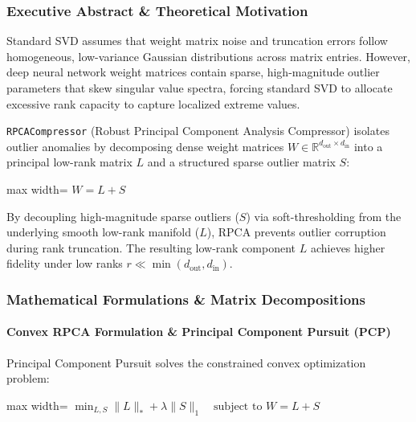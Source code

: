 \subsubsection*{Executive Abstract \& Theoretical Motivation}
Standard SVD assumes that weight matrix noise and truncation errors follow homogeneous, low-variance Gaussian distributions across matrix entries. However, deep neural network weight matrices contain sparse, high-magnitude outlier parameters that skew singular value spectra, forcing standard SVD to allocate excessive rank capacity to capture localized extreme values.

\texttt{RPCACompressor} (Robust Principal Component Analysis Compressor) isolates outlier anomalies by decomposing dense weight matrices $W \in \mathbb{R}^{d_{\text{out}} \times d_{\text{in}}}$ into a principal low-rank matrix $L$ and a structured sparse outlier matrix $S$:

\begin{center}
\begin{adjustbox}{max width=\columnwidth}
$\displaystyle
W = L + S
$
\end{adjustbox}
\end{center}

By decoupling high-magnitude sparse outliers ($S$) via soft-thresholding from the underlying smooth low-rank manifold ($L$), RPCA prevents outlier corruption during rank truncation. The resulting low-rank component $L$ achieves higher fidelity under low ranks $r \ll \min(d_{\text{out}}, d_{\text{in}})$.


\subsubsection*{Mathematical Formulations \& Matrix Decompositions}

\paragraph{Convex RPCA Formulation \& Principal Component Pursuit (PCP)}
Principal Component Pursuit solves the constrained convex optimization problem:

\begin{center}
\begin{adjustbox}{max width=\columnwidth}
$\displaystyle
\min_{L, S} \|L\|_* + \lambda \|S\|_1 \quad \text{subject to } W = L + S
$
\end{adjustbox}
\end{center}

